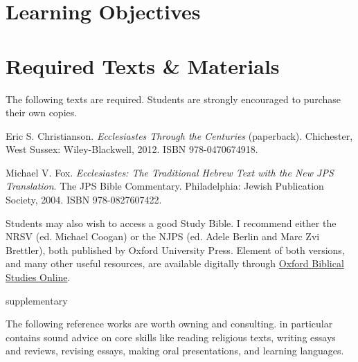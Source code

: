 \documentclass[titlepage]{article}
\newcommand\incl{../includes}
\begin{document}


  \section{Learning Objectives}
  \label{objectives}

  \edobject

\section{Required Texts \& Materials}
\label{texts}

The following texts are required. Students are strongly encouraged to
purchase their own copies.

\begingroup
\renewcommand{\section}[2]{}%
\begin{thebibliography}{Christianson}%

	 Eric S. Christianson.
    \emph{Ecclesiastes Through the Centuries} (paperback).
    Chichester, West Sussex: Wiley-Blackwell, 2012.
	ISBN 978-0470674918.

	 Michael V. Fox.
	\emph{Ecclesiastes: The Traditional Hebrew Text with the New JPS Translation}. The JPS Bible Commentary.
	Philadelphia: Jewish Publication Society, 2004.
	ISBN 978-0827607422.

\end{thebibliography}
\endgroup

Students may also wish to access a good Study Bible. I recommend either
the NRSV (ed. Michael Coogan) or the NJPS (ed. Adele Berlin and Marc Zvi
Brettler), both published by Oxford University Press. Element of both
versions, and many other useful resources, are available digitally
through \href{http://ezproxy.astheology.ns.ca:2048/login?url=http://www.oxfordbiblicalstudies.com/}{Oxford Biblical Studies Online}.

\section{Supplementary Texts}
\label{supplementary}

The following reference works are worth owning and consulting.
\cite{rlgs} in particular contains sound advice on core skills like
reading religious texts, writing essays and reviews, revising essays,
making oral presentations, and learning languages.
\end{document}
